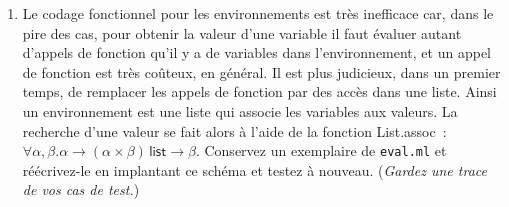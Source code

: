 \begin{enumerate}
  \item \label{q\theenumi} Le codage fonctionnel pour les
  environnements est très inefficace car, dans le pire des cas, pour
  obtenir la valeur d'une variable il faut évaluer autant d'appels de
  fonction qu'il y a de variables dans l'environnement, et un appel de
  fonction est très coûteux, en général. Il est plus judicieux, dans
  un premier temps, de remplacer les appels de fonction par des accès
  dans une liste. Ainsi un environnement est une liste qui associe les
  variables aux valeurs. La recherche d'une valeur se fait alors à
  l'aide de la fonction \textsf{List.assoc}~:~$\forall \alpha,
  \beta.\alpha \rightarrow (\alpha \times \beta) \, \textsf{list}
  \rightarrow \beta$. Conservez un exemplaire de \texttt{eval.ml} et
  réécrivez-le en implantant ce schéma et testez à
  nouveau. (\emph{Gardez une trace de vos cas de test.})

\end{enumerate}
